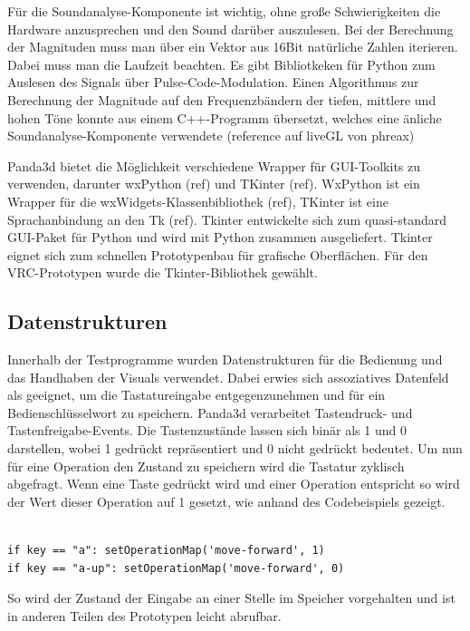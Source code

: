 F\"ur die Soundanalyse-Komponente ist wichtig, ohne gro\ss{}e Schwierigkeiten die Hardware anzusprechen und den Sound
dar\"uber auszulesen. Bei der Berechnung der Magnituden muss man \"uber ein Vektor aus 16Bit nat\"urliche Zahlen iterieren.
Dabei muss man die Laufzeit beachten. Es gibt Bibliotkeken f\"ur Python zum Auslesen des Signals \"uber Pulse-Code-Modulation.
Einen Algorithmus zur Berechnung der Magnitude auf den Frequenzb\"andern der tiefen, mittlere und hohen T\"one konnte
aus einem C++-Programm \"ubersetzt, welches eine \"anliche Soundanalyse-Komponente verwendete (reference auf liveGL von phreax)

Panda3d bietet die M\"oglichkeit verschiedene Wrapper f\"ur GUI-Toolkits zu verwenden, darunter wxPython (ref)  und TKinter (ref).
WxPython ist ein Wrapper f\"ur die wxWidgets-Klassenbibliothek (ref), TKinter ist eine Sprachanbindung an den Tk (ref). 
Tkinter entwickelte sich zum quasi-standard GUI-Paket f\"ur Python und wird mit Python zusammen ausgeliefert.
Tkinter eignet sich zum schnellen Prototypenbau f\"ur grafische Oberfl\"achen. F\"ur den VRC-Prototypen wurde die
Tkinter-Bibliothek gew\"ahlt.

\subsection{Datenstrukturen}

Innerhalb der Testprogramme wurden Datenstrukturen f\"ur die Bedienung und das Handhaben der Visuals verwendet.
Dabei erwies sich assoziatives Datenfeld als geeignet, um die Tastatureingabe entgegenzunehmen und f\"ur ein 
Bedienschl\"usselwort zu speichern. Panda3d verarbeitet Tastendruck- und Tastenfreigabe-Events. Die Tastenzust\"ande
lassen sich bin\"ar als 1 und 0 darstellen, wobei 1 gedr\"uckt repr\"asentiert und 0 nicht gedr\"uckt bedeutet.
Um nun f\"ur eine Operation den Zustand zu speichern wird die Tastatur zyklisch abgefragt. Wenn eine Taste gedr\"uckt wird
und einer Operation entspricht so wird der Wert dieser Operation auf 1 gesetzt, wie anhand des Codebeispiels gezeigt.

\begin{lstlisting}

if key == "a": setOperationMap('move-forward', 1)
if key == "a-up": setOperationMap('move-forward', 0)

\end{lstlisting}

So wird der Zustand der Eingabe an einer Stelle im Speicher vorgehalten und ist in anderen Teilen des
Prototypen leicht abrufbar.

